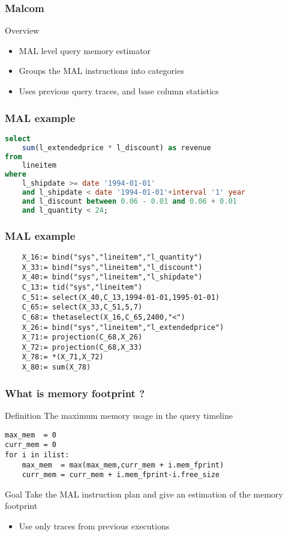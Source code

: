 \begin{frame}
\frametitle{Malcom}
\begin{block}{Overview}
\begin{itemize}
	\item MAL level query memory estimator
	\item Groups the MAL instructions into categories
	\item Uses previous query traces, and base column statistics
\end{itemize}
\end{block}
\end{frame}

\begin{frame}[fragile]
\frametitle{MAL example}
	\begin{lstlisting}[basicstyle=\ttfamily\footnotesize, language=SQL]
select
	sum(l_extendedprice * l_discount) as revenue
from
	lineitem
where
	l_shipdate >= date '1994-01-01'
	and l_shipdate < date '1994-01-01'+interval '1' year
	and l_discount between 0.06 - 0.01 and 0.06 + 0.01
	and l_quantity < 24;
	\end{lstlisting}
\end{frame}

\begin{frame}[fragile]
\frametitle{MAL example}
	\begin{lstlisting}
	X_16:= bind("sys","lineitem","l_quantity")
	X_33:= bind("sys","lineitem","l_discount")
	X_40:= bind("sys","lineitem","l_shipdate")
	C_13:= tid("sys","lineitem")
	C_51:= select(X_40,C_13,1994-01-01,1995-01-01)
	C_65:= select(X_33,C_51,5,7)
	C_68:= thetaselect(X_16,C_65,2400,"<")
	X_26:= bind("sys","lineitem","l_extendedprice")
	X_71:= projection(C_68,X_26)
	X_72:= projection(C_68,X_33)
	X_78:= *(X_71,X_72)
	X_80:= sum(X_78)
	\end{lstlisting}
\end{frame}

\begin{frame}[fragile]
\frametitle{What is memory footprint ?}
\begin{block}{Definition}
The maximum memory usage in the query timeline
\end{block}
\begin{lstlisting}
max_mem  = 0
curr_mem = 0
for i in ilist:
	max_mem  = max(max_mem,curr_mem + i.mem_fprint)
	curr_mem = curr_mem + i.mem_fprint-i.free_size
\end{lstlisting}
\end{frame}

\begin{frame}[fragile]
\begin{block}{Goal}
Take the MAL instruction plan and
give an estimation of the memory footprint
\begin{itemize}
\item Use only traces from previous executions
\end{itemize}
\end{block}
\end{frame}

